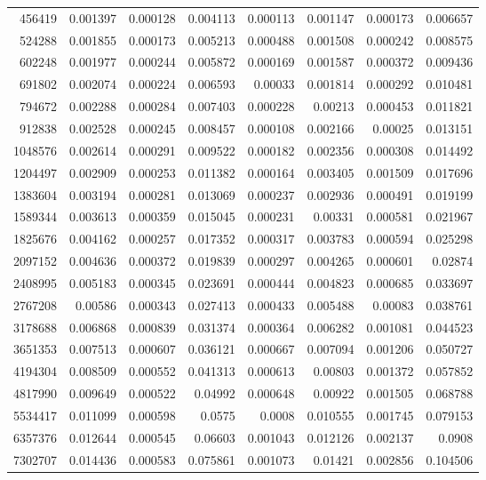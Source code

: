 \begin{tabular}{r r r r r r r r}
456419 & 0.001397 & 0.000128 & 0.004113 & 0.000113 & 0.001147 & 0.000173 & 0.006657 \\
524288 & 0.001855 & 0.000173 & 0.005213 & 0.000488 & 0.001508 & 0.000242 & 0.008575 \\
602248 & 0.001977 & 0.000244 & 0.005872 & 0.000169 & 0.001587 & 0.000372 & 0.009436 \\
691802 & 0.002074 & 0.000224 & 0.006593 & 0.00033 & 0.001814 & 0.000292 & 0.010481 \\
794672 & 0.002288 & 0.000284 & 0.007403 & 0.000228 & 0.00213 & 0.000453 & 0.011821 \\
912838 & 0.002528 & 0.000245 & 0.008457 & 0.000108 & 0.002166 & 0.00025 & 0.013151 \\
1048576 & 0.002614 & 0.000291 & 0.009522 & 0.000182 & 0.002356 & 0.000308 & 0.014492 \\
1204497 & 0.002909 & 0.000253 & 0.011382 & 0.000164 & 0.003405 & 0.001509 & 0.017696 \\
1383604 & 0.003194 & 0.000281 & 0.013069 & 0.000237 & 0.002936 & 0.000491 & 0.019199 \\
1589344 & 0.003613 & 0.000359 & 0.015045 & 0.000231 & 0.00331 & 0.000581 & 0.021967 \\
1825676 & 0.004162 & 0.000257 & 0.017352 & 0.000317 & 0.003783 & 0.000594 & 0.025298 \\
2097152 & 0.004636 & 0.000372 & 0.019839 & 0.000297 & 0.004265 & 0.000601 & 0.02874 \\
2408995 & 0.005183 & 0.000345 & 0.023691 & 0.000444 & 0.004823 & 0.000685 & 0.033697 \\
2767208 & 0.00586 & 0.000343 & 0.027413 & 0.000433 & 0.005488 & 0.00083 & 0.038761 \\
3178688 & 0.006868 & 0.000839 & 0.031374 & 0.000364 & 0.006282 & 0.001081 & 0.044523 \\
3651353 & 0.007513 & 0.000607 & 0.036121 & 0.000667 & 0.007094 & 0.001206 & 0.050727 \\
4194304 & 0.008509 & 0.000552 & 0.041313 & 0.000613 & 0.00803 & 0.001372 & 0.057852 \\
4817990 & 0.009649 & 0.000522 & 0.04992 & 0.000648 & 0.00922 & 0.001505 & 0.068788 \\
5534417 & 0.011099 & 0.000598 & 0.0575 & 0.0008 & 0.010555 & 0.001745 & 0.079153 \\
6357376 & 0.012644 & 0.000545 & 0.06603 & 0.001043 & 0.012126 & 0.002137 & 0.0908 \\
7302707 & 0.014436 & 0.000583 & 0.075861 & 0.001073 & 0.01421 & 0.002856 & 0.104506 \\

\end{tabular}
